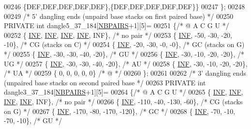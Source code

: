 \begin{DoxyCode}
00246    \{DEF,DEF,DEF,DEF,DEF\},\{DEF,DEF,DEF,DEF,DEF\}\}
00247 \};
00248 
00249 \textcolor{comment}{/* 5' dangling ends (unpaird base stacks on first paired base) */}
00250 PRIVATE \textcolor{keywordtype}{int} dangle5\_37\_184[\hyperlink{energy__const_8h_a5e75221c779d618eab81e096f37e32ce}{NBPAIRS}+1][5]=
00251 \{\textcolor{comment}{/*   @     A     C     G     U   */}
00252    \{ \hyperlink{energy__const_8h_a12c2040f25d8e3a7b9e1c2024c618cb6}{INF},  \hyperlink{energy__const_8h_a12c2040f25d8e3a7b9e1c2024c618cb6}{INF},  \hyperlink{energy__const_8h_a12c2040f25d8e3a7b9e1c2024c618cb6}{INF},  \hyperlink{energy__const_8h_a12c2040f25d8e3a7b9e1c2024c618cb6}{INF},  INF\}, \textcolor{comment}{/* no pair */}
00253    \{ \hyperlink{energy__const_8h_a12c2040f25d8e3a7b9e1c2024c618cb6}{INF},  -50,  -30,  -20,  -10\}, \textcolor{comment}{/* CG  (stacks on C) */}
00254    \{ \hyperlink{energy__const_8h_a12c2040f25d8e3a7b9e1c2024c618cb6}{INF},  -20,  -30,   -0,   -0\}, \textcolor{comment}{/* GC  (stacks on G) */}
00255    \{ \hyperlink{energy__const_8h_a12c2040f25d8e3a7b9e1c2024c618cb6}{INF},  -30,  -30,  -40,  -20\}, \textcolor{comment}{/* GU */}
00256    \{ \hyperlink{energy__const_8h_a12c2040f25d8e3a7b9e1c2024c618cb6}{INF},  -30,  -10,  -20,  -20\}, \textcolor{comment}{/* UG */}
00257    \{ \hyperlink{energy__const_8h_a12c2040f25d8e3a7b9e1c2024c618cb6}{INF},  -30,  -30,  -40,  -20\}, \textcolor{comment}{/* AU */}
00258    \{ \hyperlink{energy__const_8h_a12c2040f25d8e3a7b9e1c2024c618cb6}{INF},  -30,  -10,  -20,  -20\}, \textcolor{comment}{/* UA */}
00259    \{   0,    0,     0,    0,   0\}  \textcolor{comment}{/*  @ */}
00260 \};
00261 
00262 \textcolor{comment}{/* 3' dangling ends (unpaired base stacks on second paired base */}
00263 PRIVATE \textcolor{keywordtype}{int} dangle3\_37\_184[\hyperlink{energy__const_8h_a5e75221c779d618eab81e096f37e32ce}{NBPAIRS}+1][5]=
00264 \{\textcolor{comment}{/*   @     A     C     G     U   */}
00265    \{ \hyperlink{energy__const_8h_a12c2040f25d8e3a7b9e1c2024c618cb6}{INF},  \hyperlink{energy__const_8h_a12c2040f25d8e3a7b9e1c2024c618cb6}{INF},  \hyperlink{energy__const_8h_a12c2040f25d8e3a7b9e1c2024c618cb6}{INF},  \hyperlink{energy__const_8h_a12c2040f25d8e3a7b9e1c2024c618cb6}{INF},  INF\},  \textcolor{comment}{/* no pair */}
00266    \{ \hyperlink{energy__const_8h_a12c2040f25d8e3a7b9e1c2024c618cb6}{INF}, -110,  -40, -130,  -60\},  \textcolor{comment}{/* CG  (stacks on G) */}
00267    \{ \hyperlink{energy__const_8h_a12c2040f25d8e3a7b9e1c2024c618cb6}{INF}, -170,  -80, -170, -120\},  \textcolor{comment}{/* GC */}
00268    \{ \hyperlink{energy__const_8h_a12c2040f25d8e3a7b9e1c2024c618cb6}{INF},  -70,  -10,  -70,  -10\},  \textcolor{comment}{/* GU */}

\end{DoxyCode}
